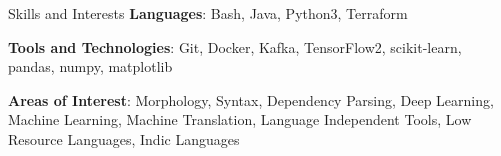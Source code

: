 \begin{rSection}{\faStar \hspace{0.5mm} Skills and Interests}
    {\textbf{Languages}: Bash, Java, Python3, Terraform}
    
    {\textbf{Tools and Technologies}: Git, Docker, Kafka, TensorFlow2, scikit-learn, pandas, numpy, matplotlib}
    
    {\textbf{Areas of Interest}: Morphology, Syntax, Dependency Parsing, Deep Learning, Machine Learning, Machine Translation, Language Independent Tools, Low Resource Languages, Indic Languages}
\end{rSection}
